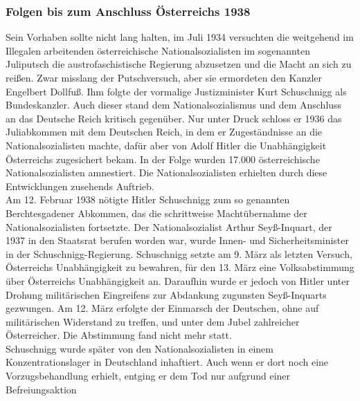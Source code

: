 \documentclass[letterpaper, 12pt]{article}
\let\tempsubsubsection\subsubsection
\renewcommand\subsubsection[1]{\vspace{0cm}\tempsubsubsection{#1}\vspace{0cm}}
\begin{document}
\subsubsection{Folgen bis zum Anschluss Österreichs 1938}
Sein Vorhaben sollte nicht lang halten, im Juli 1934 versuchten die weitgehend im Illegalen arbeitenden österreichische Nationalsozialisten im sogenannten Juliputsch die austrofaschistische Regierung abzusetzen und die Macht an sich zu reißen. Zwar misslang der Putschversuch, aber sie ermordeten den Kanzler Engelbert Dollfuß. Ihm folgte der vormalige Justizminister Kurt Schuschnigg als Bundeskanzler. Auch dieser stand dem Nationalsozialismus und dem Anschluss an das Deutsche Reich kritisch gegenüber. Nur unter Druck schloss er 1936 das Juliabkommen mit dem Deutschen Reich, in dem er Zugeständnisse an die Nationalsozialisten machte, dafür aber von Adolf Hitler die Unabhängigkeit Österreichs zugesichert bekam. In der Folge wurden 17.000 österreichische Nationalsozialisten amnestiert. Die Nationalsozialisten erhielten durch diese Entwicklungen zusehends Auftrieb. \\
Am 12. Februar 1938 nötigte Hitler Schuschnigg zum so genannten Berchtesgadener Abkommen, das die schrittweise Machtübernahme der Nationalsozialisten fortsetzte. Der Nationalsozialist Arthur Seyß-Inquart, der 1937 in den Staatsrat berufen worden war, wurde Innen- und Sicherheitsminister in der Schuschnigg-Regierung. Schuschnigg setzte am 9. März als letzten Versuch, Österreichs Unabhängigkeit zu bewahren, für den 13. März eine Volksabstimmung über Österreichs Unabhängigkeit an. Daraufhin wurde er jedoch von Hitler unter Drohung militärischen Eingreifens zur Abdankung zugunsten Seyß-Inquarts gezwungen. Am 12. März erfolgte der Einmarsch der Deutschen, ohne auf militärischen Widerstand zu treffen, und unter dem Jubel zahlreicher Österreicher. Die Abstimmung fand nicht mehr statt.
\\
Schuschnigg wurde später von den Nationalsozialisten in einem Konzentrationslager in Deutschland inhaftiert. Auch wenn er dort noch eine Vorzugsbehandlung erhielt, entging er dem Tod nur aufgrund einer Befreiungsaktion 

\clearpage


\end{document}
